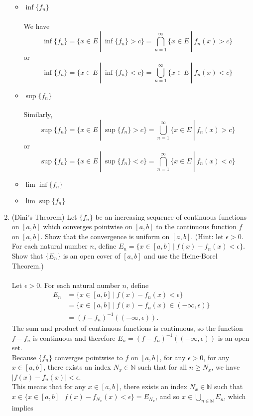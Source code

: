 \begin{enumerate}
\begin{itemize}
        \item $\inf\{f_n\}$\\
        \\We have 
        \[
            \inf\{f_n\} = \{x\in E\ |\ \inf\{f_n\}> c\} = \bigcap_{n=1}^\infty\{x\in E\ |\ f_n(x)>c\}
        \]
        or
        \[
            \inf\{f_n\} = \{x\in E\ |\ \inf\{f_n\}< c\} = \bigcup_{n=1}^\infty\{x\in E\ |\ f_n(x)<c\}
        \]
        \item $\sup\{f_n\}$\\
        \\Similarly,
        \[
            \sup\{f_n\} = \{x\in E\ |\ \sup\{f_n\}> c\} = \bigcup_{n=1}^\infty\{x\in E\ |\ f_n(x)>c\}
        \]
        or
        \[
            \sup\{f_n\} = \{x\in E\ |\ \sup\{f_n\}< c\} = \bigcap_{n=1}^\infty\{x\in E\ |\ f_n(x)<c\}
        \]
        \item $\lim\inf\{f_n\}$
        \item $\lim\sup\{f_n\}$
    \end{itemize}
    \item (Dini's Theorem) Let $\{f_n\}$ be an increasing sequence of continuous functions on $[a,b]$ which converges pointwise on $[a,b]$ to the continuous function $f$ on $[a,b]$.
    Show that the convergence is uniform on $[a,b]$. (Hint: let $\epsilon>0$. For each natural number $n$, define $E_n=\{x\in[a,b]\ |\ f(x)-f_n(x)<\epsilon\}$. Show that $\{E_n\}$ is an open cover of $[a,b]$ and use the Heine-Borel Theorem.)\\
    \\Let $\epsilon>0$. For each natural number $n$, define 
    \begin{align*}
        E_n&=\{x\in[a,b]\ |\ f(x)-f_n(x)<\epsilon\}\\
        &=\{x\in[a,b]\ |\ f(x)-f_n(x)\in(-\infty,\epsilon)\}\\
        &=(f-f_n)^{-1}((-\infty,\epsilon)).
    \end{align*}
    The sum and product of continuous functions is continuous, so the function $f-f_n$ is continuous and therefore $E_n=(f-f_n)^{-1}((-\infty,\epsilon))$ is an open set.
    \\Because $\{f_n\}$ converges pointwise to $f$ on $[a,b]$, for any $\epsilon>0$, for any $x\in[a,b]$, there exists an index $N_x\in\mathbb{N}$ such that for all $n\ge N_x$, we have $|f(x)-f_n(x)|<\epsilon$.
    \\This means that for any $x\in[a,b]$, there exists an index $N_x\in\mathbb{N}$ such that $x\in\{x\in[a,b]\ |\ f(x)-f_{N_x}(x)<\epsilon\}=E_{N_x}$, and so $x\in\bigcup_{n\in\mathbb{N}} E_n$, which implies

\end{enumerate}
